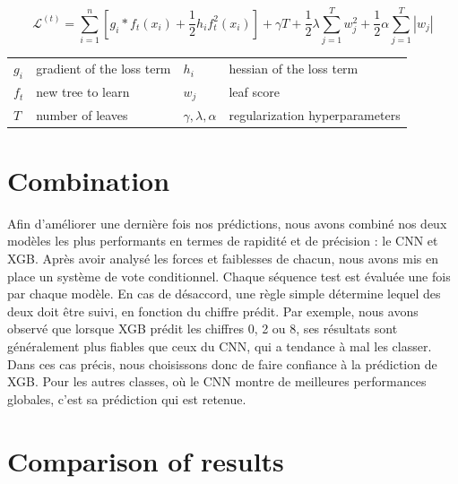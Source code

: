 \documentclass{article}
\begin{document}
\[ 
\mathcal{L}^{(t)} = \sum_{i=1}^{n} [g_i*f_{t}(x_i) + \frac{1}{2} h_i f_{t}^2(x_i)] + \gamma T + \frac{1}{2} \lambda \sum_{j=1}^{T} w_{j}^2 + \frac{1}{2} \alpha \sum_{j=1}^{T} |w_j| 
\]

\begin{tabular}{llll}
$g_i$ & gradient of the loss term & $h_i$ & hessian of the loss term \\
$f_t$ & new tree to learn         & $w_j$ & leaf score \\
$T$   & number of leaves          & $\gamma, \lambda, \alpha$ & regularization hyperparameters \\
\end{tabular}


\section{Combination}

Afin d’améliorer une dernière fois nos prédictions, 
nous avons combiné nos deux modèles les plus performants 
en termes de rapidité et de précision : le CNN et XGB. 
Après avoir analysé les forces et faiblesses de chacun, 
nous avons mis en place un système de vote conditionnel.
Chaque séquence test est évaluée une fois par chaque modèle. 
En cas de désaccord, une règle simple détermine lequel des deux doit être suivi, 
en fonction du chiffre prédit. Par exemple, nous avons observé que 
lorsque XGB prédit les chiffres 0, 2 ou 8, ses résultats sont 
généralement plus fiables que ceux du CNN, qui a tendance à mal les classer. 
Dans ces cas précis, nous choisissons donc de faire confiance à la prédiction de XGB. 
Pour les autres classes, où le CNN montre de meilleures performances globales, 
c’est sa prédiction qui est retenue.

\section{Comparison of results}
\end{document}
